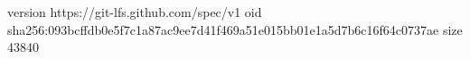 version https://git-lfs.github.com/spec/v1
oid sha256:093bcffdb0e5f7c1a87ac9ee7d41f469a51e015bb01e1a5d7b6c16f64c0737ae
size 43840

